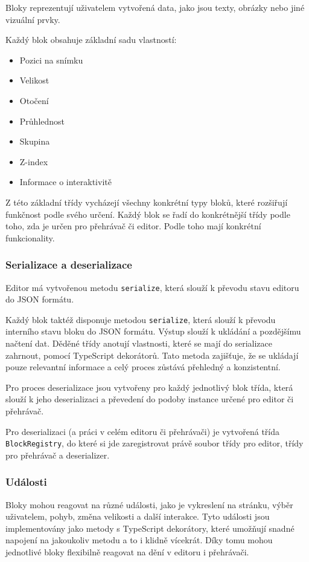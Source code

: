 Bloky reprezentují uživatelem vytvořená data, jako jsou texty, obrázky nebo jiné vizuální prvky. 

Každý blok obsahuje základní sadu vlastností: 

\begin{itemize}
	\item Pozici na snímku
	\item Velikost
	\item Otočení
	\item Průhlednost
	\item Skupina
	\item Z-index
	\item Informace o interaktivitě
\end{itemize}

Z této základní třídy vycházejí všechny konkrétní typy bloků, které rozšiřují funkčnost podle svého určení.
Každý blok se řadí do konkrétnější třídy podle toho, zda je určen pro přehrávač či editor.
Podle toho mají konkrétní funkcionality.

\subsubsection{Serializace a deserializace}

Editor má vytvořenou metodu \texttt{serialize}, která slouží k převodu stavu editoru do JSON formátu.

Každý blok taktéž disponuje metodou \texttt{serialize}, která slouží k převodu interního stavu bloku do JSON formátu. 
Výstup slouží k ukládání a pozdějšímu načtení dat. 
Děděné třídy anotují vlastnosti, které se mají do serializace zahrnout, pomocí TypeScript dekorátorů. 
Tato metoda zajišťuje, že se ukládají pouze relevantní informace a celý proces zůstává přehledný a konzistentní.

Pro proces deserializace jsou vytvořeny pro každý jednotlivý blok třída, která slouží k jeho deserializaci a převedení do podoby instance určené pro editor či přehrávač.

Pro deserializaci (a práci v celém editoru či přehrávači) je vytvořená třída \texttt{BlockRegistry}, do které si jde zaregistrovat právě soubor třídy pro editor, třídy pro přehrávač a deserializer. 

\subsubsection{Události}

Bloky mohou reagovat na různé události, jako je vykreslení na stránku, výběr uživatelem, pohyb, změna velikosti a další interakce.
Tyto události jsou implementovány jako metody s TypeScript dekorátory, které umožňují snadné napojení na jakoukoliv metodu a to i klidně vícekrát.
Díky tomu mohou jednotlivé bloky flexibilně reagovat na dění v editoru i přehrávači.

